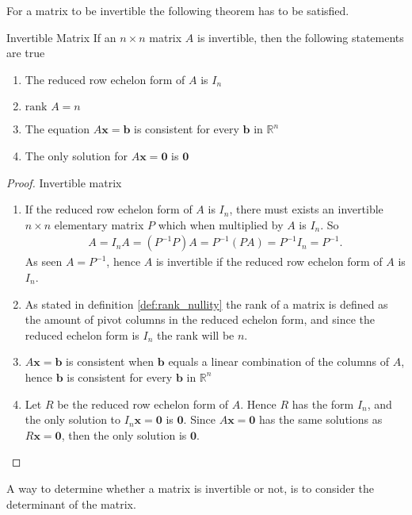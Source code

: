 For a matrix to be invertible the following theorem has to be satisfied.

\begin{theorem}{Invertible Matrix}
    \label{the:invertibleMatrix}
    If an $n \times n$ matrix $A$ is invertible, then the following statements are true
    \begin{enumerate}
        \item The reduced row echelon form of $A$ is $I_n$
        \item $\text{rank } A = n$
        \item The equation $A\mathbf{x}=\mathbf{b}$ is consistent for every $\mathbf{b}$ in $\mathbb{R}^n$
        \item The only solution for $A\mathbf{x}=\mathbf{0}$ is $\mathbf{0}$
    \end{enumerate}
    \cite[138]{LiAl}
\end{theorem}

\begin{proof}{Invertible matrix}
\begin{enumerate}
    \item  If the reduced row echelon form of $A$ is $I_n$, there must exists an invertible $n \times n$ elementary matrix $P$ which when multiplied by $A$ is $I_n$. So
    \begin{align*}
        A=I_nA=(P^{-1}P)A=P^{-1}(PA)=P^{-1}I_n=P^{-1}.
    \end{align*}
    As seen $A=P^{-1}$, hence $A$ is invertible if the reduced row echelon form of $A$ is $I_n$.
    \item As stated in definition \ref{def:rank_nullity} the rank of a matrix is defined as the amount of pivot columns in the reduced echelon form, and since the reduced echelon form is $I_n$ the rank will be $n$.
    \item $A\mathbf{x}=\mathbf{b}$ is consistent when $\mathbf{b}$ equals a linear combination of the columns of $A$, hence $\mathbf{b}$ is consistent for every $\mathbf{b}$ in $\mathbb{R}^n$
    \item Let $R$ be the reduced row echelon form of $A$. 
    Hence $R$ has the form $I_n$, and the only solution to $I_n\mathbf{x}= \mathbf{0}$ is $\mathbf{0}$. Since $A\mathbf{x}=\mathbf{0}$ has the same solutions as $R\mathbf{x}=\mathbf{0}$, then the only solution is $\mathbf{0}$.
\end{enumerate}
\end{proof}

A way to determine whether a matrix is invertible or not, is to consider the determinant of the matrix.
